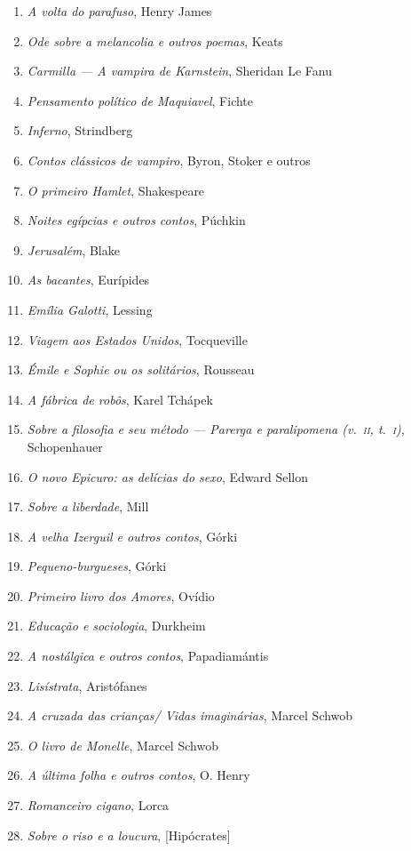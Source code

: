 \begin{enumerate}
\item \textit{A volta do parafuso}, Henry James
\item \textit{Ode sobre a melancolia e outros poemas}, Keats 
\item \textit{Carmilla --- A vampira de Karnstein}, Sheridan Le Fanu
\item \textit{Pensamento político de Maquiavel}, Fichte
\item \textit{Inferno}, Strindberg
\item \textit{Contos clássicos de vampiro}, Byron, Stoker e outros
\item \textit{O primeiro Hamlet}, Shakespeare
\item \textit{Noites egípcias e outros contos}, Púchkin
\item \textit{Jerusalém}, Blake
\item \textit{As bacantes}, Eurípides
\item \textit{Emília Galotti}, Lessing
\item \textit{Viagem aos Estados Unidos}, Tocqueville
\item \textit{Émile e Sophie ou os solitários}, Rousseau 
\item \textit{A fábrica de robôs}, Karel Tchápek 
\item \textit{Sobre a filosofia e seu método --- Parerga e paralipomena (v.~\textsc{ii}, t.~\textsc{i})}, Schopenhauer 
\item \textit{O novo Epicuro: as delícias do sexo}, Edward Sellon
\item \textit{Sobre a liberdade}, Mill
\item \textit{A velha Izerguil e outros contos}, Górki
\item \textit{Pequeno-burgueses}, Górki
\item \textit{Primeiro livro dos Amores}, Ovídio
\item \textit{Educação e sociologia}, Durkheim
\item \textit{A nostálgica e outros contos}, Papadiamántis 
\item \textit{Lisístrata}, Aristófanes 
\item \textit{A cruzada das crianças/ Vidas imaginárias}, Marcel Schwob
\item \textit{O livro de Monelle}, Marcel Schwob
\item \textit{A última folha e outros contos}, O. Henry
\item \textit{Romanceiro cigano}, Lorca
\item \textit{Sobre o riso e a loucura}, [Hipócrates]

\end{enumerate}
